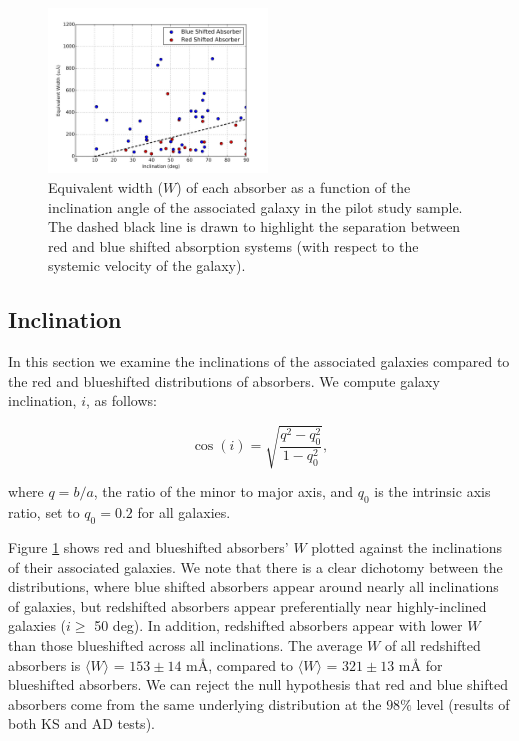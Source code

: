\documentclass[iop]{emulateapj-rtx4}
\begin{document}
\begin{figure}[h!]
        \centering
        \includegraphics[width=0.52\textwidth]{W(fancy_inclination)_dif_annotated.jpg}
        \caption{\small{Equivalent width ($W$) of each absorber as a function of the inclination angle of the associated galaxy in the pilot study sample. The dashed black line is drawn to highlight the separation between red and blue shifted absorption systems (with respect to the systemic velocity of the galaxy).}}
        \label{ew_vs_inclination}
        \vspace{2pt}

\end{figure} 


\subsection{Inclination}
In this section we examine the inclinations of the associated galaxies compared to the red and blueshifted distributions of absorbers. We compute galaxy inclination, $i$, as follows:

\begin{equation}
	\cos(i) = \sqrt{\frac{q^2 - q_0^2}{1 - q_0^2}},
\end{equation}

\noindent where $q = b/a$, the ratio of the minor to major axis, and $q_0$ is the intrinsic axis ratio, set to $q_0 = 0.2$ for all galaxies.

Figure \ref{ew_vs_inclination} shows red and blueshifted absorbers' $W$ plotted against the inclinations of their associated galaxies. We note that there is a clear dichotomy between the distributions, where blue shifted absorbers appear around nearly all inclinations of galaxies, but redshifted absorbers appear preferentially near highly-inclined galaxies ($i \geq$ 50 deg). In addition, redshifted absorbers appear with lower $W$ than those blueshifted across all inclinations. The average $W$ of all redshifted absorbers is $\langle W \rangle$ = $153 \pm 14$  $\textrm{m\AA}$, compared to $\langle W \rangle$ = $321 \pm 13$ $\textrm{m\AA}$ for blueshifted absorbers. We can reject the null hypothesis that red and blue shifted absorbers come from the same underlying distribution at the $98\%$ level (results of both KS and AD tests). 
\end{document}
